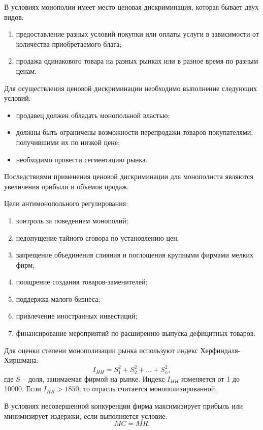 \begin{itemize}
\begin{enumerate}
        В условиях монополии имеет место ценовая дискриминация, которая бывает
        двух видов:
        \begin{enumerate}
            \item предоставление разных условий покупки или оплаты услуги в
                зависимости от количества приобретаемого блага;
            \item продажа одинакового товара на разных рынках или в разное время
                по разным ценам.
        \end{enumerate}
        
        Для осуществления ценовой дискриминации необходимо выполнение следующих
        условий:
        \begin{itemize}
            \item продавец должен обладать монопольной властью;
            \item должны быть ограничены возможности перепродажи товаров
            покупателями, получившими их по низкой цене;
            \item необходимо провести сегментацию рынка.
        \end{itemize}
        
        Последствиями применения ценовой дискриминации для монополиста
        являются увеличения прибыли и объемов продаж.
        
        Цели антимонопольного регулирования:
        \begin{enumerate}
            \item контроль за поведением монополий;
            \item недопущение тайного сговора по установлению цен;
            \item запрещение объединения слияния и поглощения крупными фирмами
            мелких фирм;
            \item поощрение создания товаров-заменителей;
            \item поддержка малого бизнеса;
            \item привлечение иностранных инвестиций;
            \item финансирование мероприятий по расширению выпуска дефицитных
            товаров.
        \end{enumerate}
        
        Для оценки степени монополизации рынка используют индекс Херфиндаля-
        Хиршмана:
        \[
            I_{HH} = S_1^2 + S_2^2 + \ldots + S_n^2,
        \]
        где \( S \) -- доля, занимаемая фирмой на рынке. Индекс \( I_{HH} \)
        изменяется от 1 до 10000. Если \( I_{HH} > 1850 \), то отрасль
        считается монополизированной.
    \end{enumerate}
       
    В условиях несовершенной конкуренции фирма максимизирует прибыль или
    минимизирует издержки, если выполняется условие:
    \[
        MC = MR.
    \]
\end{itemize}
